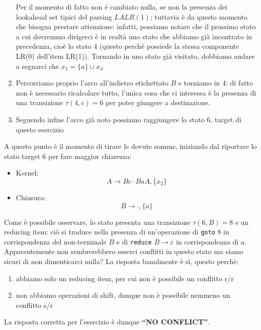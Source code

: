 \documentclass[class=book, crop=false, oneside, 12pt]{standalone}
\begin{document}
\begin{enumerate}
    Per il momento di fatto non è cambiato nulla, se non la presenza dei lookahead set tipici del parsing \(LALR(1)\); tuttavia è da questo momento che bisogna prestare attenzione: infatti, possiamo notare che il prossimo stato a cui dovremmo dirigerci è in realtà uno stato che abbiamo già incontrato in precedenza, cioè lo stato 4 (questo perchè possiede la stessa componente LR(0) dell'item LR(1)). Tornando in uno stato già visitato, dobbiamo andare a segnarci che \(x_1 = \{a\} \cup x_4\).
    \item Percorriamo proprio l'arco all'indietro etichettato \(B\) e torniamo in 4: di fatto non è necessario ricalcolare tutto, l'unica cosa che ci interessa è la presenza di una transizione \(\tau(4,c) = 6\) per poter giungere a destinazione. 
    \item Seguendo infine l'arco già noto possiamo raggiungere lo stato 6, target di questo esercizio
\end{enumerate}
A questo punto è il momento di tirare le dovute somme, iniziando dal riportare lo stato target 6 per fare maggior chiarezza:
\begin{itemize}
    \item Kernel:
    \begin{equation*}
        A \to Bc \cdot BaA, \{x_2\} 
    \end{equation*}
    \item Chiusura:
    \begin{equation*}
        B \to \cdot, \{a\} 
    \end{equation*}
\end{itemize}

Come è possibile osservare, lo stato presenta una transizione \(\tau(6, B)=8\) e un reducing item: ciò si traduce nella presenza di un'operazione di \texttt{goto} 8 in corrispondenza del non-terminale \(B\) e di \texttt{reduce} \(B \to \varepsilon\) in corrispondenza di \(a\). Apparentemente non sembrerebbero esserci conflitti in questo stato ma siamo sicuri di non dimenticarci nulla? La risposta banalmente è sì, questo perchè:

\begin{enumerate}
    \item abbiamo solo un reducing item, per cui non è possibile un conflitto r/r
    \item non abbiamo operazioni di shift, dunque non è possibile nemmeno un conflitto s/r
\end{enumerate}

La risposta corretta per l'esercizio è dunque \textbf{“NO CONFLICT”}.
\end{document}
